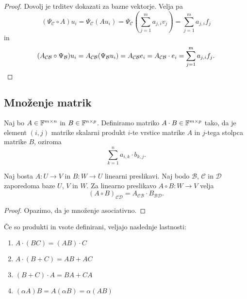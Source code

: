 \documentclass[12pt, a4paper]{article}
\begin{document}
\begin{proof}
Dovolj je trditev dokazati za bazne vektorje. Velja pa
\[
(\Psi_{\mathcal{C}}\circ A)u_i=\Psi_{\mathcal{C}}(Au_i)
=\Psi_{\mathcal{C}}\left(\sum_{j=1}^m a_{j,i}v_j\right)
=\sum_{j=1}^m a_{j,i}f_j
\]
in
\[
(A_{\mathcal{CB}}\circ \Psi_{\mathcal{B}})u_i=A_{\mathcal{CB}}(\Psi_{\mathcal{B}}u_i)
=A_{\mathcal{CB}}e_i
=A_{\mathcal{CB}}\cdot e_i
=\sum_{j=1}^m a_{j,i}f_j.\qedhere
\]
\end{proof}



\newpage

\subsection{Množenje matrik}

\begin{okvir}
\begin{definicija}
Naj bo $A\in\mathbb{F}^{m\times n}$ in $B\in\mathbb{F}^{n\times p}$. Definiramo matriko $A\cdot B\in\mathbb{F}^{m\times p}$ tako, da je element $(i,j)$ matrike skalarni produkt $i$-te vrstice matrike $A$ in $j$-tega stolpca matrike $B$, oziroma
\[
\sum_{k=1}^n a_{i,k}\cdot b_{k,j}.
\]
\end{definicija}
\end{okvir}

\begin{izrek}
Naj bosta $A\colon U\to V$ in $B\colon W\to U$ linearni preslikavi. Naj bodo $\mathcal{B}$, $\mathcal{C}$ in $\mathcal{D}$ zaporedoma baze $U$, $V$ in $W$. Za linearno preslikavo $A\circ B\colon W\to V$ velja
\[
(A\circ B)_{\mathcal{CD}}=A_{\mathcal{CB}}\cdot B_{\mathcal{BD}}.
\]
\end{izrek}

\begin{proof}
Opazimo, da je množenje asociativno.
\end{proof}

\begin{posledica}
Če so produkti in vsote definirani, veljajo naslednje lastnosti:

\begin{enumerate}
\item $A\cdot(BC)=(AB)\cdot C$
\item $A\cdot(B+C)=AB+AC$
\item $(B+C)\cdot A=BA+CA$
\item $(\alpha A)B=A(\alpha B)=\alpha(AB)$
\end{enumerate}
\end{posledica}
\end{document}
